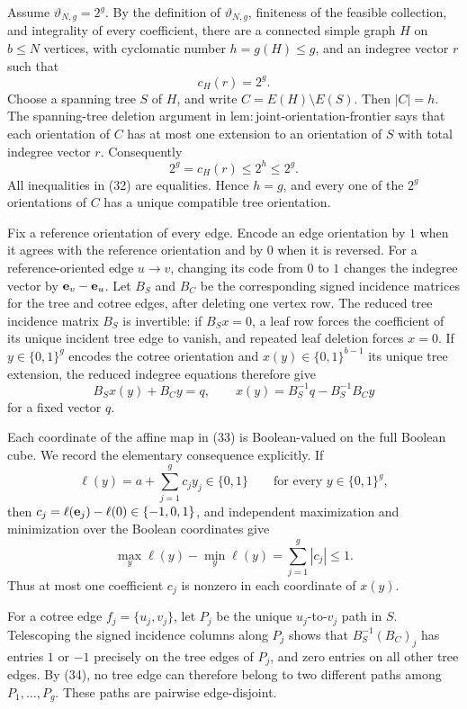 Assume \(\vartheta_{N,g}=2^g\).  By the definition of \(\vartheta_{N,g}\), finiteness of the feasible collection, and integrality of every coefficient, there are a connected simple graph \(H\) on \(b\leq N\) vertices, with cyclomatic number \(h=g(H)\leq g\), and an indegree vector \(r\) such that
\[
 c_H(r)=2^g.
\tag{31}
\]
Choose a spanning tree \(S\) of \(H\), and write \(C=E(H)\setminus E(S)\).  Then \(|C|=h\).  The spanning-tree deletion argument in \(\mathrm{lem:joint\mbox{-}orientation\mbox{-}frontier}\) says that each orientation of \(C\) has at most one extension to an orientation of \(S\) with total indegree vector \(r\).  Consequently
\[
 2^g=c_H(r)\leq2^h\leq2^g.
\tag{32}
\]
All inequalities in (32) are equalities.  Hence \(h=g\), and every one of the \(2^g\) orientations of \(C\) has a unique compatible tree orientation.

Fix a reference orientation of every edge.  Encode an edge orientation by \(1\) when it agrees with the reference orientation and by \(0\) when it is reversed.  For a reference-oriented edge \(u\to v\), changing its code from \(0\) to \(1\) changes the indegree vector by \({\bf e}_v-{\bf e}_u\).  Let \(B_S\) and \(B_C\) be the corresponding signed incidence matrices for the tree and cotree edges, after deleting one vertex row.  The reduced tree incidence matrix \(B_S\) is invertible: if \(B_Sx=0\), a leaf row forces the coefficient of its unique incident tree edge to vanish, and repeated leaf deletion forces \(x=0\).  If \(y\in\{0,1\}^g\) encodes the cotree orientation and \(x(y)\in\{0,1\}^{b-1}\) its unique tree extension, the reduced indegree equations therefore give
\[
 B_Sx(y)+B_Cy=q,
 \qquad
 x(y)=B_S^{-1}q-B_S^{-1}B_Cy
\tag{33}
\]
for a fixed vector \(q\).

Each coordinate of the affine map in (33) is Boolean-valued on the full Boolean cube.  We record the elementary consequence explicitly.  If
\[
 \ell(y)=a+\sum_{j=1}^g c_jy_j\in\{0,1\}
 \qquad\text{for every }y\in\{0,1\}^g,
\]
then \(c_j=\ell({\bf e}_j)-\ell(0)\in\{-1,0,1\}\), and independent maximization and minimization over the Boolean coordinates give
\[
 \max_y\ell(y)-\min_y\ell(y)=\sum_{j=1}^g|c_j|\leq1.
\tag{34}
\]
Thus at most one coefficient \(c_j\) is nonzero in each coordinate of \(x(y)\).

For a cotree edge \(f_j=\{u_j,v_j\}\), let \(P_j\) be the unique \(u_j\)-to-\(v_j\) path in \(S\).  Telescoping the signed incidence columns along \(P_j\) shows that \(B_S^{-1}(B_C)_j\) has entries \(1\) or \(-1\) precisely on the tree edges of \(P_j\), and zero entries on all other tree edges.  By (34), no tree edge can therefore belong to two different paths among \(P_1,\ldots,P_g\).  These paths are pairwise edge-disjoint.

